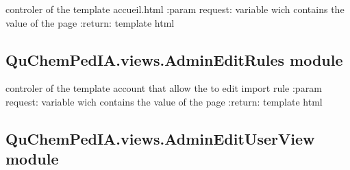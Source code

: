 \documentclass[letterpaper,10pt,english]{sphinxmanual}
\begin{document}
\begin{fulllineitems}
\label{\detokenize{QuChemPedIA.views:QuChemPedIA.views.AccueilView.accueil}}
controler of the template accueil.html
:param request: variable wich contains the value of the page
:return: template html

\end{fulllineitems}



\subsection{QuChemPedIA.views.AdminEditRules module}
\label{\detokenize{QuChemPedIA.views:module-QuChemPedIA.views.AdminEditRules}}\label{\detokenize{QuChemPedIA.views:quchempedia-views-admineditrules-module}}

\begin{fulllineitems}
\label{\detokenize{QuChemPedIA.views:QuChemPedIA.views.AdminEditRules.edit_rule_admin}}
controler of the template account that allow the to edit import rule
:param request: variable wich contains the value of the page
:return: template html

\end{fulllineitems}


\begin{fulllineitems}
\label{\detokenize{QuChemPedIA.views:QuChemPedIA.views.AdminEditRules.switch_rule}}
\end{fulllineitems}



\subsection{QuChemPedIA.views.AdminEditUserView module}
\label{\detokenize{QuChemPedIA.views:module-QuChemPedIA.views.AdminEditUserView}}\label{\detokenize{QuChemPedIA.views:quchempedia-views-adminedituserview-module}}
\end{document}
